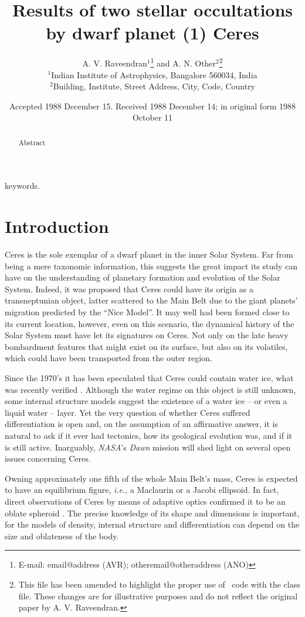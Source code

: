 \documentclass[useAMS,usenatbib]{mn2e}
\title[Results of two stellar occultations by Ceres]{Results of two stellar occultations by dwarf planet (1) Ceres}
\author[A. V. Raveendran and A. N. Other]{A. V. Raveendran$^{1}$\thanks{E-mail:
email@address (AVR); otheremail@otheraddress (ANO)} and A. N.
Other$^{2}$\footnotemark[1]\thanks{This file has been amended to
highlight the proper use of \LaTeXe\ code with the class file.
These changes are for illustrative purposes and do not reflect the
original paper by A. V. Raveendran.}\\
$^{1}$Indian Institute of Astrophysics, Bangalore 560034, India\\
$^{2}$Building, Institute, Street Address, City, Code, Country}
\begin{document}
\date{Accepted 1988 December 15. Received 1988 December 14; in original form 1988 October 11}

\pagerange{\pageref{firstpage}--\pageref{lastpage}} 

\maketitle

\label{firstpage}

\begin{abstract}
Abstract
\end{abstract}

\begin{keywords}
keywords.
\end{keywords}

\section{Introduction}

Ceres is the sole exemplar of a dwarf planet in the inner Solar System. Far from being a mere taxonomic information, this suggests the great impact its study can have on the understanding of planetary formation and evolution of the Solar System. Indeed, it was proposed that Ceres could have its origin as a transneptunian object, latter scattered to the Main Belt due to the giant planets' migration predicted by the ``Nice Model''. It may well had been formed close to its current location, however, even on this scenario, the dynamical history of the Solar System must have let its signatures on Ceres. Not only on the late heavy bombardment features that might exist on its surface, but also on its volatiles, which could have been transported from the outer region.

Since the 1970's it has been speculated that Ceres could contain water ice, what was recently verified \citep{Kuppers2014}. Although the water regime on this object is still unknown, some internal structure models suggest the existence of a water ice -- or even a liquid water -- layer. Yet the very question of whether Ceres suffered differentiation is open and, on the assumption of an affirmative answer, it is natural to ask if it ever had tectonics, how its geological evolution was, and if it is still active. Inarguably, \textit{NASA}'s \textit{Dawn} mission will shed light on several open issues concerning Ceres.

Owning approximately one fifth of the whole Main Belt's mass, Ceres is expected to have an equilibrium figure, \textit{i.e.}, a Maclaurin or a Jacobi ellipsoid. In fact, direct observations of Ceres by means of adaptive optics confirmed it to be an oblate spheroid \citep{Drummond2014}. The precise knowledge of its shape and dimensions is important, for the models of density, internal structure and differentiation can depend on the size and oblateness of the body.
\end{document}
